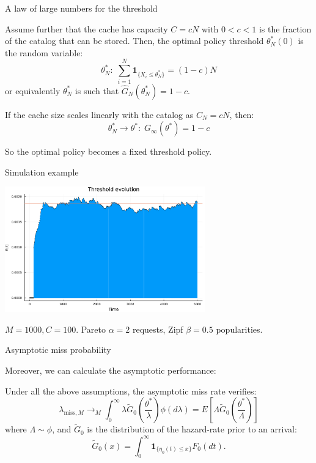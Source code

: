 \documentclass[aspectratio=169]{beamer}
\newcommand{\E}[1]{E\left[#1 \right]}
\newcommand{\ind}[1]{\mathbf{1}_{#1}}
\begin{document}
\begin{frame}{A law of large numbers for the threshold}
	
	Assume further that the cache has capacity $C=cN$ with $0<c<1$ is the fraction of the catalog that can be stored. Then, the optimal policy threshold $\theta^*_N(0)$ is the random variable:
	\begin{equation*}
		\theta^*_N: \; \sum_{i=1}^N \ind{\{X_i\leqslant \theta^*_N\}} = (1-c)N
	\end{equation*}
	or equivalently $\theta^*_N$ is such that $\hat{G}_N(\theta^*_N) = 1-c$.

	\pause \vfill

	\begin{corollary}
		If the cache size scales linearly with the catalog as $C_N = cN$, then:
		\begin{equation*}
			\theta^*_N \to \theta^*: \; G_\infty(\theta^*) = 1-c
		\end{equation*}
	\end{corollary}

	So the optimal policy becomes a \alert{fixed} threshold policy.
\end{frame}

\begin{frame}{Simulation example}
	\begin{center}
		\includegraphics[width=0.65\textwidth]{figuras/simulation_example.pdf}

		{\footnotesize $M=1000, C=100$. Pareto $\alpha=2$ requests, Zipf $\beta=0.5$  popularities.}
	\end{center}
\end{frame}

\begin{frame}{Asymptotic miss probability}
	
	Moreover, we can calculate the asymptotic performance:

	\begin{theorem}
		Under all the above assumptions, the asymptotic \alert{miss rate} verifies:
		\begin{equation*}
			\lambda_{\text{miss},M} \to_M \int_0^\infty \lambda \tilde{G}_0\left(\frac{\theta^*}{\lambda}\right) \phi(d\lambda) = \E{\Lambda \tilde{G}_0\left(\frac{\theta^*}{\Lambda}\right)} 
		\end{equation*}
		where $\Lambda \sim \phi$, and $\tilde{G}_0$ is the distribution of the hazard-rate prior to an arrival:
		\begin{equation*}
			\tilde{G}_0(x) = \int_0^\infty \ind{\{\eta_0(t)\leqslant x\}} F_0(dt).
		\end{equation*}
	\end{theorem}
\end{frame}
\end{document}

